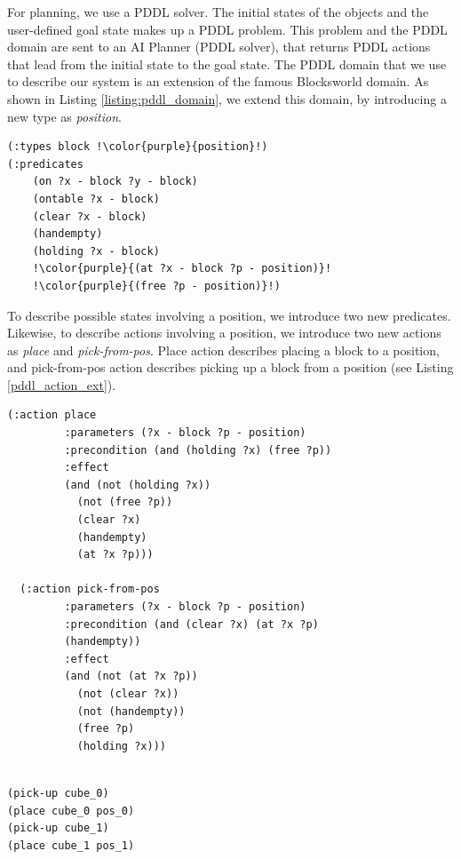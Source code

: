 \documentclass[10pt, conference]{IEEEtran}
\begin{document}
For planning, we use a PDDL solver. The initial states of the objects and the user-defined goal state makes up a PDDL problem. This problem and the PDDL domain are sent to an AI Planner (PDDL solver), that returns PDDL actions that lead from the initial state to the goal state. The PDDL domain that we use to describe our system is an extension of the famous Blocksworld \cite{blocksworld} domain. As shown in Listing \ref{listing:pddl_domain}, we extend this domain, by introducing a new type as \textit{position}. 

\begin{lstlisting}[label=listing:pddl_domain, caption=PDDL domain definition: types and predicates (extensions to original blocksworld domain are in red), escapechar=!]
(:types block !\color{purple}{position}!)
(:predicates
    (on ?x - block ?y - block)
    (ontable ?x - block)
    (clear ?x - block)
    (handempty)
    (holding ?x - block)
    !\color{purple}{(at ?x - block ?p - position)}!
    !\color{purple}{(free ?p - position)}!)
\end{lstlisting}

To describe possible states involving a position, we introduce two new predicates. Likewise, to describe actions involving a position, we introduce two new actions as \textit{place} and \textit{pick-from-pos}. Place action describes placing a block to a position, and pick-from-pos action describes picking up a block from a position (see Listing \ref{pddl_action_ext}).

\begin{lstlisting}[language=PDDL, label=pddl_action_ext, caption=PDDL actions of the extended blocksworld domain]
  (:action place
	     :parameters (?x - block ?p - position)
	     :precondition (and (holding ?x) (free ?p))
	     :effect
	     (and (not (holding ?x))
		   (not (free ?p))
		   (clear ?x)
		   (handempty)
		   (at ?x ?p)))
		   
  (:action pick-from-pos
	     :parameters (?x - block ?p - position)
	     :precondition (and (clear ?x) (at ?x ?p)
	     (handempty))
	     :effect
	     (and (not (at ?x ?p))
		   (not (clear ?x))
		   (not (handempty))
		   (free ?p)
		   (holding ?x)))
     
\end{lstlisting}

\begin{lstlisting}[label=listing:solution, caption=An example solution]
(pick-up cube_0)
(place cube_0 pos_0)
(pick-up cube_1)
(place cube_1 pos_1)
\end{lstlisting}
\end{document}

